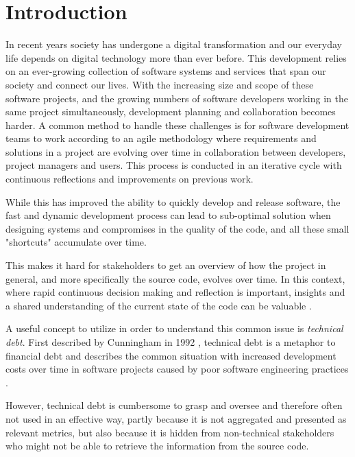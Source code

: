 \section{Introduction}
In recent years society has undergone a digital transformation and our everyday life depends on digital technology more than ever before. 
This development relies on an ever-growing collection of software systems and services that span our society and connect our lives. 
With the increasing size and scope of these software projects, and the growing numbers of software developers working in the same project simultaneously, development planning and collaboration becomes harder.
A common method to handle these challenges is for software development teams to work according to an agile methodology \cite{hazzan_agile_2014} where requirements and solutions in a project are evolving over time in collaboration between developers, project managers and users. 
This process is conducted in an iterative cycle with continuous reflections and improvements on previous work.

While this has improved the ability to quickly develop and release software, the fast and dynamic development process can lead to sub-optimal solution when designing systems and compromises in the quality of the code, and all these small "shortcuts" accumulate over time.

This makes it hard for stakeholders to get an overview of how the project in general, and more specifically the source code, evolves over time.
In this context, where rapid continuous decision making and reflection is important, insights and a shared understanding of the current state of the code can be valuable \cite{ball_if_1997}.

A useful concept to utilize in order to understand this common issue is \textit{technical debt}.
First described by Cunningham in 1992 \cite{cunningham_wycash_1992}, technical debt is a metaphor to financial debt and describes the common situation with increased development costs over time in software projects caused by poor software engineering practices \cite{tom_exploration_2013}.

However, technical debt is cumbersome to grasp and oversee and therefore often not used in an effective way, partly because it is not aggregated and presented as relevant metrics, but also because it is hidden from non-technical stakeholders who might not be able to retrieve the information from the source code.

